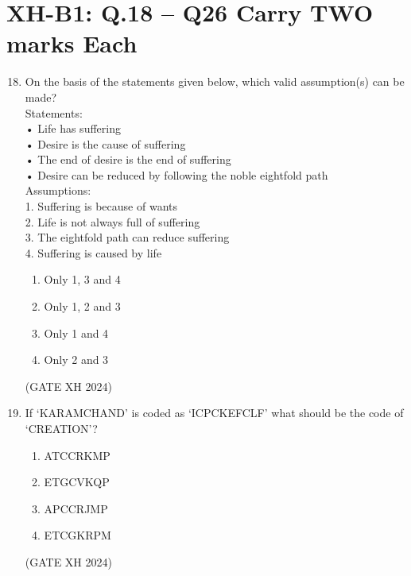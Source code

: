 \documentclass{article}
\begin{document}
\section*{XH-B1: Q.18 – Q26 Carry TWO marks Each}
\begin{enumerate}
\setcounter{enumi}{17}
    \item On the basis of the statements given below, which valid assumption(s) can be made? \\
    Statements: \\
    • Life has suffering \\
    • Desire is the cause of suffering \\
    • The end of desire is the end of suffering \\
    • Desire can be reduced by following the noble eightfold path \\
    Assumptions: \\
    1. Suffering is because of wants \\
    2. Life is not always full of suffering \\ 
    3. The eightfold path can reduce suffering \\ 
    4. Suffering is caused by life
    
    \begin{multicols}{4}
        \begin{enumerate}
            \item Only 1, 3 and 4
            \item Only 1, 2 and 3
            \item Only 1 and 4
            \item Only 2 and 3
        \end{enumerate}
    \end{multicols} \hfill (GATE XH 2024)

    \item If ‘KARAMCHAND’ is coded as ‘ICPCKEFCLF’ what should be the code of ‘CREATION’?
    
    \begin{multicols}{4}
        \begin{enumerate}
            \item ATCCRKMP
            \item ETGCVKQP
            \item APCCRJMP
            \item ETCGKRPM
        \end{enumerate}
    \end{multicols} \hfill (GATE XH 2024)


\end{enumerate}
\end{document}
